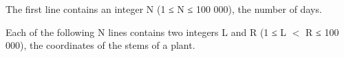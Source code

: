 The first line contains an integer N (1 ≤ N ≤ 100 000), the number of days.  

   Each of the following N lines contains two integers L and R (1 ≤ L $<$ R ≤ 100 000), the coordinates of the stems of a plant.  

\